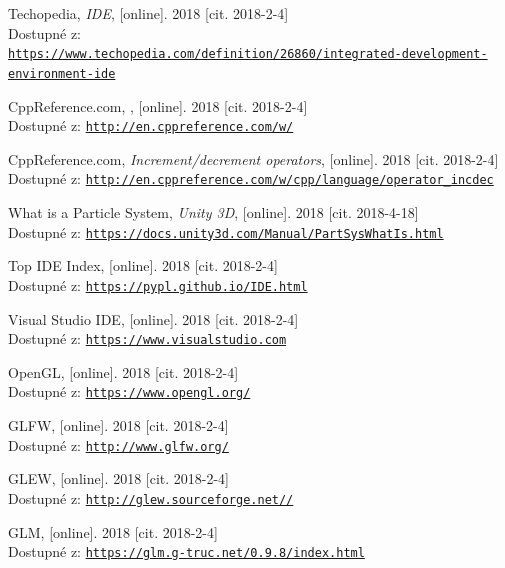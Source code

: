 \documentclass[czech,public,dept460,male,cpdeclaration]{diploma}
\begin{document}
\begin{thebibliography}{99}
	 Techopedia,
		\textit{IDE}, [online]. 2018 [cit. 2018-2-4]\\
		Dostupné z:\\ \href{https://www.techopedia.com/definition/26860/integrated-development-environment-ide}{\texttt{https://www.techopedia.com/definition/26860/integrated-development-environment-ide}}
		
	 CppReference.com,
		, [online]. 2018 [cit. 2018-2-4]\\
		Dostupné z: \href{http://en.cppreference.com/w/}{\texttt{http://en.cppreference.com/w/}}
		
	 CppReference.com,
		\textit{Increment/decrement operators}, [online]. 2018 [cit. 2018-2-4]\\
		Dostupné z: \href{http://en.cppreference.com/w/cpp/language/operator\_incdec}{\texttt{http://en.cppreference.com/w/cpp/language/operator\_incdec}}
		
	 What is a Particle System,
		\textit{Unity 3D}, [online]. 2018 [cit. 2018-4-18]\\
		Dostupné z: \href{https://docs.unity3d.com/Manual/PartSysWhatIs.html}{\texttt{https://docs.unity3d.com/Manual/PartSysWhatIs.html}}
		
	 Top IDE Index,
		[online]. 2018 [cit. 2018-2-4]\\
		Dostupné z: \href{https://pypl.github.io/IDE.html}{\texttt{https://pypl.github.io/IDE.html}}
		
	 Visual Studio IDE,
		[online]. 2018 [cit. 2018-2-4]\\
		Dostupné z: \href{https://www.visualstudio.com}{\texttt{https://www.visualstudio.com}}
		
	 OpenGL,
		[online]. 2018 [cit. 2018-2-4]\\
		Dostupné z: \href{https://www.opengl.org/}{\texttt{https://www.opengl.org/}}
		
	 GLFW,
		[online]. 2018 [cit. 2018-2-4]\\
		Dostupné z: \href{http://www.glfw.org/}{\texttt{http://www.glfw.org/}}
		
	 GLEW,
		[online]. 2018 [cit. 2018-2-4]\\
		Dostupné z: \href{http://glew.sourceforge.net/}{\texttt{http://glew.sourceforge.net//}}
		
	 GLM,
		[online]. 2018 [cit. 2018-2-4]\\
		Dostupné z: \href{https://glm.g-truc.net/0.9.8/index.html}{\texttt{https://glm.g-truc.net/0.9.8/index.html}}
		

\end{thebibliography}
\end{document}
